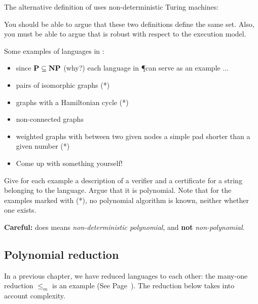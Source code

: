The alternative definition of \NP uses non-deterministic Turing machines:

You should be able to argue that these two definitions define the same
set. Also, you must be able to argue that \NP is robust with respect
to the execution model.

Some examples of languages in \NP:

\begin{itemize}
\item 
since ${\bf P} \subseteq {\bf NP}$ (why?) each language in \P can serve as an example ...
\item 
pairs of isomorphic graphs (*)
\item 
graphs with a Hamiltonian cycle (*)
\item
non-connected graphs
\item
weighted graphs with between two given nodes a simple pad shorter than
a given number (*)
\item
Come up with something yourself!
\end{itemize}

Give for each example a description of a verifier and a certificate
for a string belonging to the language. Argue that it is
polynomial. Note that for the examples marked with (*), no polynomial
algorithm is known, neither whether one exists.

{\bf Careful:} \NP does means {\em non-deterministic polynomial},
and {\bf not} {\em non-polynomial}.

\subsection{Polynomial reduction}

In a previous chapter, we have reduced languages to each other: the
many-one reduction $\leq_m$ {\mbox is an example} (See
Page~\pageref{manyone}). The reduction below takes into account
complexity.




